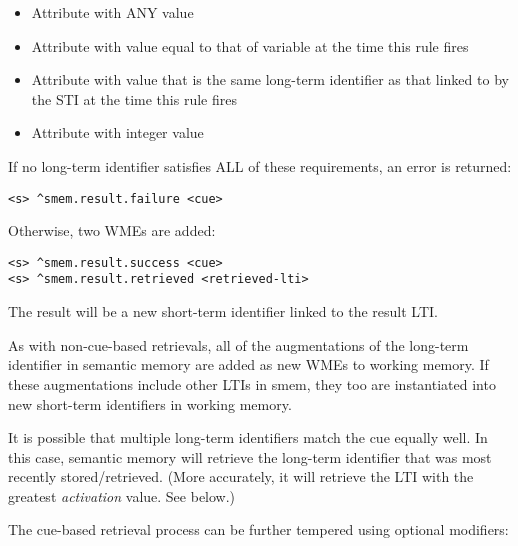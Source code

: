 \vspace{-12pt}
\begin{itemize}
	\item
		Attribute  with ANY value
		\vspace{-6pt}
	\item
		Attribute  with value equal to that of variable  at the time this rule fires
		\vspace{-6pt}
	\item
		Attribute  with value that is the same long-term identifier as that linked to by the  STI at the time this rule fires
		\vspace{-6pt}
	\item
		Attribute  with integer value 
		\vspace{-6pt}
\end{itemize}

If no long-term identifier satisfies ALL of these requirements, an error is returned:

\begin{verbatim}
<s> ^smem.result.failure <cue>
\end{verbatim}

Otherwise, two WMEs are added:

\begin{verbatim}
<s> ^smem.result.success <cue>
<s> ^smem.result.retrieved <retrieved-lti>
\end{verbatim}

The result  will be a new short-term identifier linked to the result LTI.

As with non-cue-based retrievals, all of the augmentations of the long-term identifier in semantic memory are added as new WMEs to working memory. If these augmentations include other LTIs in smem, they too are instantiated into new short-term identifiers in working memory.

It is possible that multiple long-term identifiers match the cue equally well.
In this case, semantic memory will retrieve the long-term identifier that was most recently stored/retrieved.
(More accurately, it will retrieve the LTI with the greatest \emph{activation} value. See below.)

The cue-based retrieval process can be further tempered using optional modifiers:

